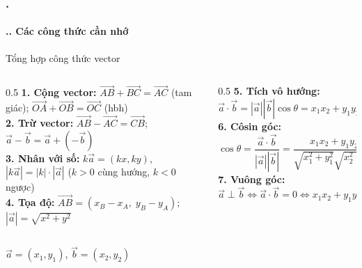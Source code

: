 \documentclass[11pt, aspectratio=169]{beamer}
\begin{document}
\begin{frame}[fragile]
    \frametitle{\thesection. \insertsection}
    \framesubtitle{\thesection.\thesubsection. Các công thức cần nhớ}

    \begin{block}{Tổng hợp công thức vector}
        \vspace{0.2cm} %
        \begin{columns}[T, onlytextwidth]
            \begin{column}{0.5\textwidth}
                \textbf{1. Cộng vector:} $\vec{AB}+\vec{BC}=\vec{AC}$ (tam giác); $\vec{OA}+\vec{OB}=\vec{OC}$ (hbh) \\
                \vspace{0.15cm}
                \textbf{2. Trừ vector:} $\vec{AB}-\vec{AC}=\vec{CB}$; $\vec{a}-\vec{b}=\vec{a}+(-\vec{b})$ \\
                \vspace{0.15cm}
                \textbf{3. Nhân với số:} $k\vec{a}=(kx,ky)$, $|k\vec{a}|=|k|\cdot|\vec{a}|$ ($k>0$ cùng hướng, $k<0$ ngược) \\
                \vspace{0.15cm}
                \textbf{4. Tọa độ:} $\vec{AB}=(x_B-x_A,\;y_B-y_A)$; $|\vec{a}|=\sqrt{x^2+y^2}$
            \end{column}

            \hspace{0.5cm}

            \begin{column}{0.5\textwidth}
                \textbf{5. Tích vô hướng:} $\vec{a}\cdot\vec{b}=|\vec{a}||\vec{b}|\cos\theta=x_1x_2+y_1y_2$ \\
                \vspace{0.15cm}
                \textbf{6. Côsin góc:} $\cos\theta=\dfrac{\vec{a}\cdot\vec{b}}{|\vec{a}||\vec{b}|}=\dfrac{x_1x_2+y_1y_2}{\sqrt{x_1^2+y_1^2}\sqrt{x_2^2+y_2^2}}$ \\
                \vspace{0.15cm}
                \textbf{7. Vuông góc:} $\vec{a}\perp\vec{b}\iff\vec{a}\cdot\vec{b}=0\iff x_1x_2+y_1y_2=0$
            \end{column}
        \end{columns}
        \vspace{0.1cm}
    \end{block}

    \begin{center}
        \footnotesize $\vec{a}=(x_1,y_1)$, $\vec{b}=(x_2,y_2)$
    \end{center}
\end{frame}
\end{document}
